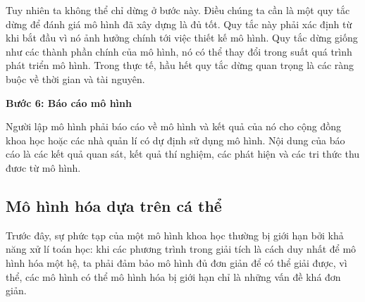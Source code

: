 \documentclass[13pt]{extreport}
\begin{document}
Tuy nhiên ta không thể chỉ dừng ở bước này. Điều chúng ta cần là một quy tắc dừng để đánh giá mô hình đã xây dựng là đủ tốt. Quy tắc này phải xác định từ khi bắt đầu vì nó ảnh hưởng chính tới việc thiết kế mô hình. Quy tắc dừng giống như các thành phần chính của mô hình, nó có thể thay đổi trong suất quá trình phát triển mô hình. Trong thực tế, hầu hết quy tắc dừng quan trọng là các ràng buộc về thời gian và tài nguyên.

\textbf{Bước 6: Báo cáo mô hình}

Người lập mô hình phải báo cáo về mô hình và kết quả của nó cho cộng đồng khoa học hoặc các nhà quản lí có dự định sử dụng mô hình. Nội dung của báo cáo là các kết quả quan sát, kết quả thí nghiệm, các phát hiện và các tri thức thu đươc từ mô hình.

\subsection{Mô hình hóa dựa trên cá thể}
\indent Trước đây, sự phức tạp của một mô hình khoa học thường bị giới hạn bởi khả năng xử lí toán học: khi các phương trình trong giải tích là cách duy nhất để mô hình hóa một hệ, ta phải đảm bảo mô hình đủ đơn giản để có thể giải được, vì thể, các mô hình có thể mô hình hóa bị giới hạn chỉ là những vấn đề khá đơn giản.
\end{document}
